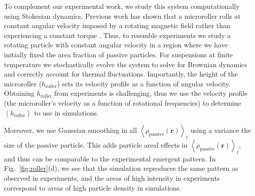 \documentclass[12pt]{article}
\begin{document}
To complement our experimental work, we study this system computationally using Stokesian dynamics. Previous work has shown that a microroller rolls at constant angular velocity imposed by a rotating magnetic field rather than experiencing a constant torque \cite{sprinkle_driven_2020}. Thus, to resemble experiments we study a rotating particle with constant angular velocity in a region where we have initially fixed the area fraction of passive particles. For suspensions at finite temperature we stochastically evolve the system to solve for Brownian dynamics and correctly account for thermal fluctuations. Importantly, the height of the microroller ($h_{\mathrm{roller}}$) sets its velocity profile as a function of angular velocity. Obtaining $h_{\mathrm{roller}}$ from experiments is challenging, thus we use the velocity profile (the microroller's velocity as a function of rotational frequencies) to determine $ \left < h_{\mathrm{roller}} \right > $ to use in simulations. 

Moreover, we use Gaussian smoothing in all $\left < \rho_{\mathrm{passive}}\left( \mathbf{r} \right) \right >_t$ using a variance the size of the passive particle. This adds particle areal effects in $\left < \rho_{\mathrm{passive}}\left( \mathbf{r} \right) \right >_t$, and thus can be comparable to the experimental emergent pattern. In Fig.~\ref{fig:roller}(d), we see that the simulation reproduces the same pattern as observed in experiments, and the areas of high intensity in experiments correspond to areas of high particle density in simulations.
\end{document}
